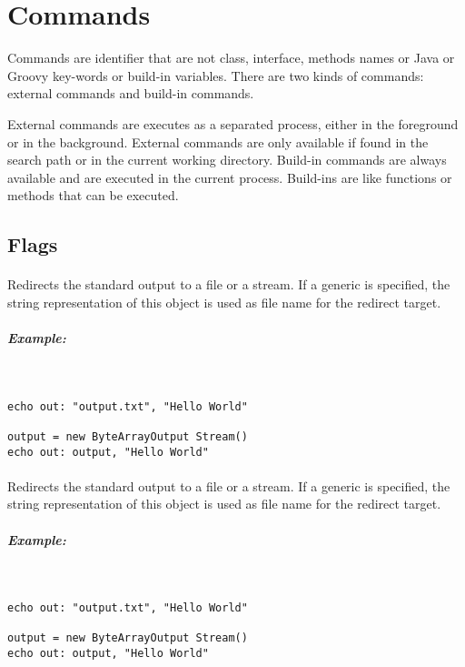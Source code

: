 \section{Commands}

Commands are identifier that are not class, interface, methods names or Java
or Groovy key-words or build-in variables. There are two kinds of commands:
external commands and build-in commands.

External commands are executes as a separated process, either in the foreground
or in the background. External commands are only available if found in the
search path or in the current working directory.
Build-in commands are always available and are executed in the current process.
Build-ins are like functions or methods that can be executed.

\subsection{Flags}

\paragraph{}

Redirects the standard output to a
file or a stream. If a generic  is specified, the string
representation of this object is used as file name for the redirect target.

\subparagraph{Example:}
~

\begin{lstlisting}[style=Groovybash, label={lst:example_cd}]
echo out: "output.txt", "Hello World"

output = new ByteArrayOutput Stream()
echo out: output, "Hello World"
\end{lstlisting}

\paragraph{}

Redirects the standard output to a
file or a stream. If a generic  is specified, the string
representation of this object is used as file name for the redirect target.

\subparagraph{Example:}
~

\begin{lstlisting}[style=Groovybash, label={lst:example_cd}]
echo out: "output.txt", "Hello World"

output = new ByteArrayOutput Stream()
echo out: output, "Hello World"
\end{lstlisting}

